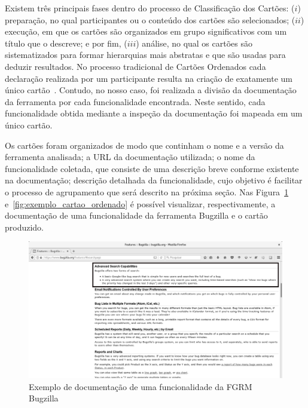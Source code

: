 Existem três principais fases dentro do processo de Classificação dos Cartões:
($i$) preparação, no qual participantes ou o conteúdo dos cartões são
selecionados; ($ii$) execução, em que os cartões são organizados em grupo
significativos com um título que o descreve; e por fim, ($iii$) análise, no qual
os cartões são sistematizados para formar hierarquias mais abstratas e que são
usadas para deduzir resultados. No processo tradicional de Cartões Ordenados
cada declaração realizada por um participante resulta na criação de exatamente
um único cartão~\cite{just2008towards}. Contudo, no nosso caso, foi realizada a
divisão da documentação da ferramenta por cada funcionalidade encontrada. Neste
sentido, cada funcionalidade obtida mediante a inspeção da documentação foi
mapeada em um único cartão.

Os cartões foram organizados de modo que continham o nome e a versão da
ferramenta analisada; a URL da documentação utilizada; o nome da funcionalidade
coletada, que consiste de uma descrição breve conforme existente na
documentação; descrição detalhada da funcionalidade, cujo objetivo é facilitar o
processo de agrupamento que será descrito na próxima seção. Nas
Figura~\ref{fig:documentacao_bugzilla} e~\ref{fig:exemplo_cartao_ordenado} é
possível visualizar, respectivamente, a documentação de uma funcionalidade da
ferramenta Bugzilla e o cartão produzido.

\begin{figure}[htpb]
	\centering
	\includegraphics[width=0.9\linewidth]{./chapter-estudo-funcionalidades-fgrm/img/documentacao_bugzilla.png}
	\caption{Exemplo de documentação de uma funcionalidade da FGRM Bugzilla}
\label{fig:documentacao_bugzilla}
\end{figure}

